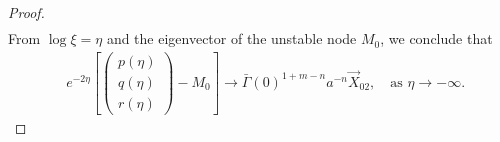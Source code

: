 \documentclass[a4paper,11pt]{article}
\def\bG{\bar{\Gamma}}
\numberwithin{step}{dummy}
\begin{document}
\begin{proof}
\begin{align*}
\end{align*}
From $\log\xi = \eta$ and the eigenvector of the unstable node $M_0$, we conclude that
\begin{align} \label{eq:asym_alpha}
   &e^{-2\eta}\left[\begin{pmatrix}
   p(\eta) \\ q(\eta) \\ r(\eta)
  \end{pmatrix}
  - M_0\right]
  \rightarrow {\bar\Gamma(0)^{1+m-n}a^{-n}}\vec{X}_{02}, \quad \text{as $\eta \rightarrow -\infty$.}
\end{align}


\end{proof}
\end{document}
